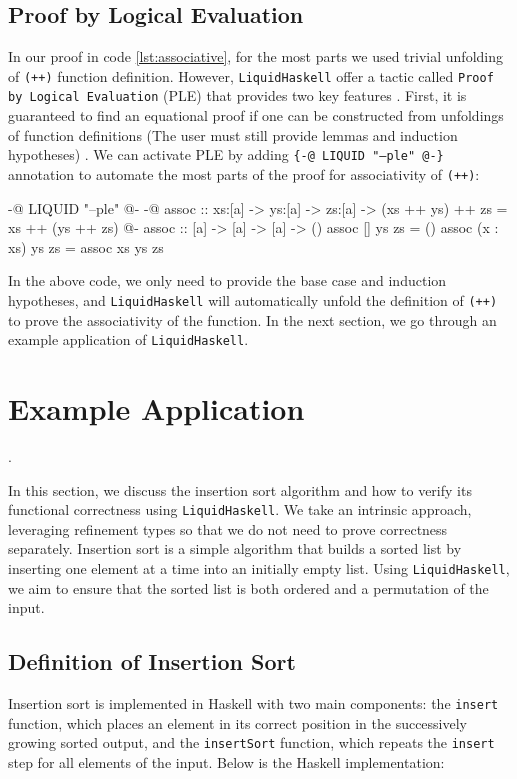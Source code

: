 \documentclass[]{rptuseminar}
\begin{document}
\subsection{Proof by Logical Evaluation}
In our proof in code \ref{lst:associative}, for the most parts we used trivial unfolding of \texttt{(++)} function definition.
However, \texttt{LiquidHaskell} offer a tactic called \texttt{Proof by Logical Evaluation} (PLE) 
that provides two key features \cite{vazou_refinement_2018}. First, it is guaranteed to find an equational proof if one can be constructed
from unfoldings of function definitions (The user must still provide lemmas and induction hypotheses) \cite{vazou_refinement_2018}.
We can activate PLE by adding \texttt{\{-@ LIQUID "---ple" @-\}} annotation to automate the most parts of the proof for associativity of \texttt{(++)}:

\begin{haskell}
{-@ LIQUID "--ple" @-}
{-@ assoc :: xs:[a] -> ys:[a] -> zs:[a] 
  -> { (xs ++ ys) ++ zs = xs ++ (ys ++ zs) } @-}
assoc :: [a] -> [a] -> [a] -> ()
assoc [] ys zs = ()
assoc (x : xs) ys zs = assoc xs ys zs
\end{haskell}

In the above code, we only need to provide the base case and induction hypotheses, and 
\texttt{LiquidHaskell} will automatically unfold the definition of \texttt{(++)} to prove the associativity of the function.
In the next section, we go through an example application of \texttt{LiquidHaskell}.
\section{Example Application}. 
\label{sec:example}

In this section, we discuss the insertion sort algorithm and how to verify its functional correctness using \texttt{LiquidHaskell}.  
We take an intrinsic approach, leveraging refinement types so that we do not need to prove correctness separately.  
Insertion sort is a simple algorithm that builds a sorted list by inserting one element at a time into an initially empty list.  
Using \texttt{LiquidHaskell}, we aim to ensure that the sorted list is both ordered and a permutation of the input.  

\subsection{Definition of Insertion Sort}

Insertion sort is implemented in Haskell with two main components: 
the \texttt{insert} function, which places an element in its correct position in the successively growing sorted output, 
and the \texttt{insertSort} function, which repeats the \texttt{insert} step for all elements of the input. Below is the Haskell implementation:
\end{document}
